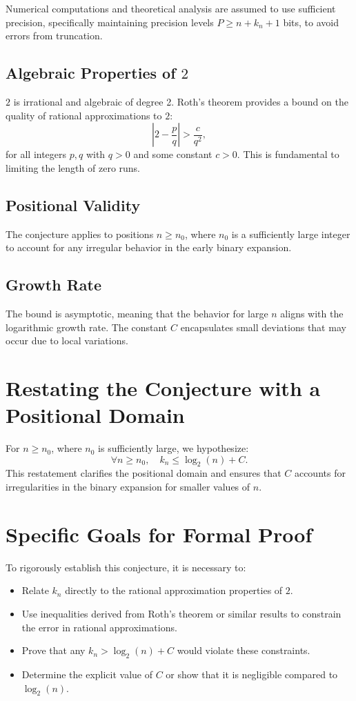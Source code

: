 Numerical computations and theoretical analysis are assumed to use sufficient precision, specifically maintaining precision levels \(P \geq n + k_n + 1\) bits, to avoid errors from truncation.

\subsection*{Algebraic Properties of \(2\)}

\(2\) is irrational and algebraic of degree 2. Roth’s theorem provides a bound on the quality of rational approximations to \(2\):
\[
\left|2 - \frac{p}{q}\right| > \frac{c}{q^2},
\]
for all integers \(p, q\) with \(q > 0\) and some constant \(c > 0\). This is fundamental to limiting the length of zero runs.

\subsection*{Positional Validity}

The conjecture applies to positions \(n \geq n_0\), where \(n_0\) is a sufficiently large integer to account for any irregular behavior in the early binary expansion.

\subsection*{Growth Rate}

The bound is asymptotic, meaning that the behavior for large \(n\) aligns with the logarithmic growth rate. The constant \(C\) encapsulates small deviations that may occur due to local variations.

\section*{Restating the Conjecture with a Positional Domain}

For \(n \geq n_0\), where \(n_0\) is sufficiently large, we hypothesize:
\[
\forall n \geq n_0, \quad k_n \leq \log_2(n) + C.
\]
This restatement clarifies the positional domain and ensures that \(C\) accounts for irregularities in the binary expansion for smaller values of \(n\).

\section*{Specific Goals for Formal Proof}

To rigorously establish this conjecture, it is necessary to:
\begin{itemize}
    \item Relate \(k_n\) directly to the rational approximation properties of \(2\).
    \item Use inequalities derived from Roth's theorem or similar results to constrain the error in rational approximations.
    \item Prove that any \(k_n > \log_2(n) + C\) would violate these constraints.
    \item Determine the explicit value of \(C\) or show that it is negligible compared to \(\log_2(n)\).
\end{itemize}

